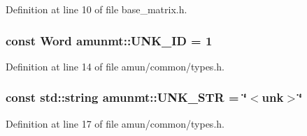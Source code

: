 Definition at line 10 of file base\+\_\+matrix.\+h.

\subsubsection[{\texorpdfstring{U\+N\+K\+\_\+\+ID}{UNK_ID}}]{\setlength{\rightskip}{0pt plus 5cm}const {\bf Word} amunmt\+::\+U\+N\+K\+\_\+\+ID = 1}\hypertarget{namespaceamunmt_a7904fd3bd044d608e81e54933a771ec9}{}\label{namespaceamunmt_a7904fd3bd044d608e81e54933a771ec9}


Definition at line 14 of file amun/common/types.\+h.

\subsubsection[{\texorpdfstring{U\+N\+K\+\_\+\+S\+TR}{UNK_STR}}]{\setlength{\rightskip}{0pt plus 5cm}const std\+::string amunmt\+::\+U\+N\+K\+\_\+\+S\+TR = \char`\"{}$<$unk$>$\char`\"{}}\hypertarget{namespaceamunmt_aff26c2cbd5a97e90ecdc5e0dbba13516}{}\label{namespaceamunmt_aff26c2cbd5a97e90ecdc5e0dbba13516}


Definition at line 17 of file amun/common/types.\+h.

